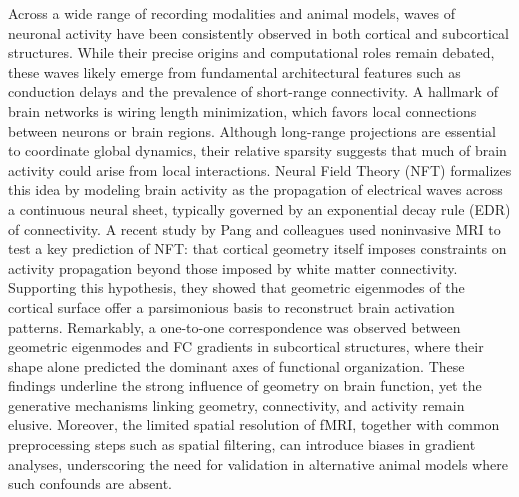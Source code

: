 \documentclass{article}
\begin{document}
Across a wide range of recording modalities and animal models, waves of neuronal activity have been consistently observed in both cortical and subcortical structures\cite{raut2021global, ye2023brain, matsui2016transient, xu2023interacting}. While their precise origins and computational roles remain debated, these waves likely emerge from fundamental architectural features such as conduction delays and the prevalence of short-range connectivity\cite{muller2018cortical}. A hallmark of brain networks is wiring length minimization, which favors local connections between neurons or brain regions\cite{bullmore2012economy}. Although long-range projections are essential to coordinate global dynamics\cite{o2013causal, betzel2018specificity, vohryzek2025human}, their relative sparsity suggests that much of brain activity could arise from local interactions. Neural Field Theory (NFT) formalizes this idea by modeling brain activity as the propagation of electrical waves across a continuous neural sheet\cite{robinson1997propagation, robinson2016eigenmodes, gabay2018dynamics}, typically governed by an exponential decay rule (EDR) of connectivity\cite{ercsey2013predictive}. A recent study by Pang and colleagues\cite{pang2023geometric} used noninvasive MRI to test a key prediction of NFT: that cortical geometry itself imposes constraints on activity propagation beyond those imposed by white matter connectivity. Supporting this hypothesis, they showed that geometric eigenmodes of the cortical surface offer a parsimonious basis to reconstruct brain activation patterns\cite{pang2023geometric}. Remarkably, a one-to-one correspondence was observed between geometric eigenmodes and FC gradients in subcortical structures, where their shape alone predicted the dominant axes of functional organization\cite{pang2023geometric}. These findings underline the strong influence of geometry on brain function, yet the generative mechanisms linking geometry, connectivity, and activity remain elusive. Moreover, the limited spatial resolution of fMRI, together with common preprocessing steps such as spatial filtering, can introduce biases in gradient analyses\cite{watson2023connectopic}, underscoring the need for validation in alternative animal models where such confounds are absent.
\end{document}
